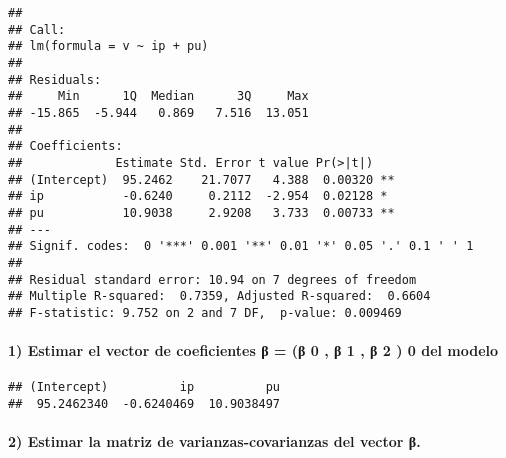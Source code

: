 \documentclass[
]{article}
\newenvironment{Shaded}{\begin{snugshade}}{\end{snugshade}}
\newcommand{\DecValTok}[1]{\textcolor[rgb]{0.00,0.00,0.81}{#1}}
\newcommand{\FunctionTok}[1]{\textcolor[rgb]{0.00,0.00,0.00}{#1}}
\newcommand{\NormalTok}[1]{#1}
\newcommand{\SpecialCharTok}[1]{\textcolor[rgb]{0.00,0.00,0.00}{#1}}
\begin{document}
\begin{verbatim}
## 
## Call:
## lm(formula = v ~ ip + pu)
## 
## Residuals:
##     Min      1Q  Median      3Q     Max 
## -15.865  -5.944   0.869   7.516  13.051 
## 
## Coefficients:
##             Estimate Std. Error t value Pr(>|t|)   
## (Intercept)  95.2462    21.7077   4.388  0.00320 **
## ip           -0.6240     0.2112  -2.954  0.02128 * 
## pu           10.9038     2.9208   3.733  0.00733 **
## ---
## Signif. codes:  0 '***' 0.001 '**' 0.01 '*' 0.05 '.' 0.1 ' ' 1
## 
## Residual standard error: 10.94 on 7 degrees of freedom
## Multiple R-squared:  0.7359, Adjusted R-squared:  0.6604 
## F-statistic: 9.752 on 2 and 7 DF,  p-value: 0.009469
\end{verbatim}

\hypertarget{estimar-el-vector-de-coeficientes-ux3b2-ux3b2-0-ux3b2-1-ux3b2-2-0-del-modelo}{%
\paragraph{1) Estimar el vector de coeficientes β = (β 0 , β 1 , β 2 ) 0
del
modelo}\label{estimar-el-vector-de-coeficientes-ux3b2-ux3b2-0-ux3b2-1-ux3b2-2-0-del-modelo}}

\begin{Shaded}
\end{Shaded}

\begin{verbatim}
## (Intercept)          ip          pu 
##  95.2462340  -0.6240469  10.9038497
\end{verbatim}

\hypertarget{estimar-la-matriz-de-varianzas-covarianzas-del-vector-ux3b2.}{%
\paragraph{2) Estimar la matriz de varianzas-covarianzas del vector
β.}\label{estimar-la-matriz-de-varianzas-covarianzas-del-vector-ux3b2.}}

\begin{Shaded}
\end{Shaded}
\end{document}
